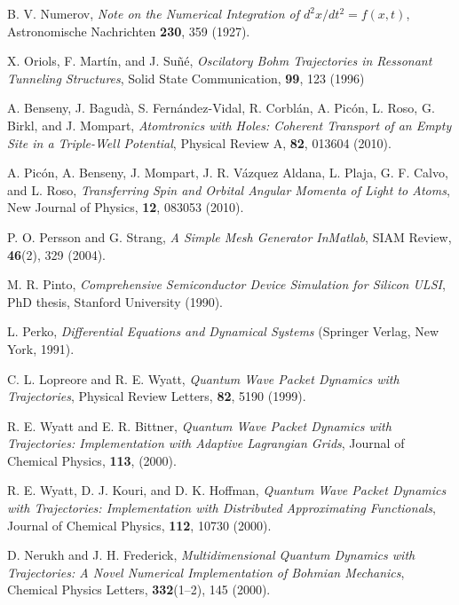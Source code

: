 \documentclass[onecolumn,nofootinbib, secnumarabic, amsmath, nobibnotes,12pt,aps,pra]{revtex4-1}
\begin{document}
\begin{thebibliography}{999}
B. V. Numerov, \emph{Note on the Numerical Integration of $d^2 x/dt^2 = f(x,t)$}, Astronomische Nachrichten \textbf{230},  359 (1927).

X. Oriols, F. Mart\'{i}n, and J. Su\~{n}\'{e}, \emph{Oscilatory Bohm Trajectories in Ressonant Tunneling Structures}, Solid State Communication, \textbf{99},  123 (1996)

A. Benseny, J. Bagud\` {a}, S. Fern\'{a}ndez-Vidal, R. Corbl\'{a}n, A. Pic\'{o}n, L. Roso, G. Birkl, and J. Mompart, \emph{Atomtronics with Holes: Coherent Transport of an Empty Site in a Triple-Well Potential}, Physical Review A, \textbf{82},  013604 (2010).

A. Pic\'{o}n, A. Benseny, J. Mompart, J. R. V\'{a}zquez Aldana, L. Plaja, G. F. Calvo, and L. Roso, \emph{Transferring Spin and Orbital Angular Momenta of Light to Atoms}, New Journal of Physics, \textbf{12},  083053 (2010).

P. O. Persson and G. Strang, \emph{A Simple Mesh Generator InMatlab}, SIAM Review, \textbf{46}(2),  329 (2004).

M. R. Pinto, \emph{Comprehensive Semiconductor Device Simulation for Silicon ULSI}, PhD thesis, Stanford University (1990).

L. Perko, \emph{Differential Equations and Dynamical Systems} (Springer Verlag, New York, 1991).

C. L. Lopreore and R. E. Wyatt, \emph{Quantum Wave Packet Dynamics with Trajectories}, Physical Review Letters, \textbf{82},  5190 (1999).

R. E. Wyatt and E. R. Bittner, \emph{Quantum Wave Packet Dynamics with Trajectories: Implementation with Adaptive Lagrangian Grids}, Journal of Chemical Physics, \textbf{113},  (2000).

R. E. Wyatt, D. J. Kouri, and D. K. Hoffman, \emph{Quantum Wave Packet Dynamics with Trajectories: Implementation with Distributed Approximating Functionals}, Journal of Chemical Physics, \textbf{112},  10730 (2000).

D. Nerukh and J. H. Frederick, \emph{Multidimensional Quantum Dynamics with Trajectories: A Novel Numerical Implementation of
Bohmian Mechanics}, Chemical Physics Letters, \textbf{332}(1--2),  145 (2000).


\end{thebibliography}
\end{document}
